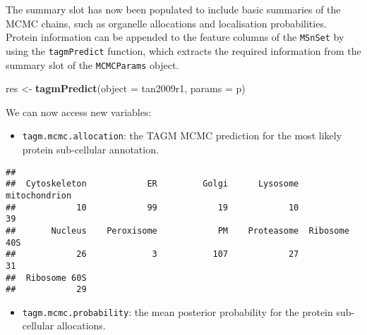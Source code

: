 \documentclass[9pt,a4paper,]{extarticle}
\newenvironment{Shaded}{\begin{snugshade}}{\end{snugshade}}
\newcommand{\DataTypeTok}[1]{\textcolor[rgb]{0.13,0.29,0.53}{#1}}
\newcommand{\KeywordTok}[1]{\textcolor[rgb]{0.13,0.29,0.53}{\textbf{#1}}}
\newcommand{\NormalTok}[1]{#1}
\newcommand{\OperatorTok}[1]{\textcolor[rgb]{0.81,0.36,0.00}{\textbf{#1}}}
\newcommand{\StringTok}[1]{\textcolor[rgb]{0.31,0.60,0.02}{#1}}
\begin{document}
The summary slot has now been populated to include basic summaries of
the MCMC chains, such as organelle allocations and localisation
probabilities. Protein information can be appended to the feature
columns of the \texttt{MSnSet} by using the \texttt{tagmPredict} function, which
extracts the required information from the summary slot of the
\texttt{MCMCParams} object.

\begin{Shaded}
\begin{Highlighting}[]
\NormalTok{res <-}\StringTok{ }\KeywordTok{tagmPredict}\NormalTok{(}\DataTypeTok{object =}\NormalTok{ tan2009r1, }\DataTypeTok{params =}\NormalTok{ p)}
\end{Highlighting}
\end{Shaded}

We can now access new variables:

\begin{itemize}
\item
  \texttt{tagm.mcmc.allocation}: the TAGM MCMC prediction for the most likely
  protein sub-cellular annotation.
\end{itemize}

\begin{Shaded}
\end{Shaded}

\begin{verbatim}
## 
##  Cytoskeleton            ER         Golgi      Lysosome mitochondrion 
##            10            99            19            10            39 
##       Nucleus    Peroxisome            PM    Proteasome  Ribosome 40S 
##            26             3           107            27            31 
##  Ribosome 60S 
##            29
\end{verbatim}

\begin{itemize}
\item
  \texttt{tagm.mcmc.probability}: the mean posterior probability for the protein
  sub-cellular allocations.
\end{itemize}

\begin{Shaded}
\end{Shaded}
\end{document}
